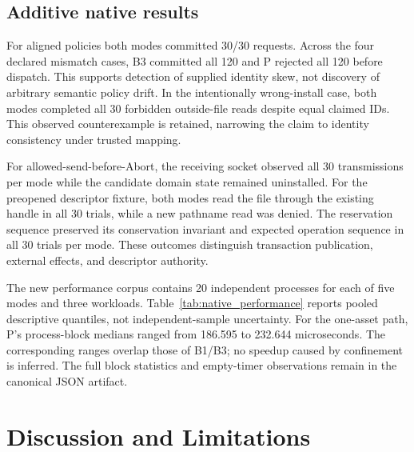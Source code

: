 \documentclass[electronics,article,submit,pdftex,moreauthors]{Definitions/mdpi}
\newcommand{\EvidenceDir}{../../../work_reports/pbea/204_Astra_review/revision/generated}
\begin{document}
\subsection{Additive native results}
\begin{table}[H]\caption{Additional B3/P observations from the separately frozen revision source.}\centering\end{table}
For aligned policies both modes committed 30/30 requests. Across the four declared mismatch cases, B3 committed all 120 and P rejected all 120 before dispatch. This supports detection of supplied identity skew, not discovery of arbitrary semantic policy drift. In the intentionally wrong-install case, both modes completed all 30 forbidden outside-file reads despite equal claimed IDs. This observed counterexample is retained, narrowing the claim to identity consistency under trusted mapping.

For allowed-send-before-Abort, the receiving socket observed all 30 transmissions per mode while the candidate domain state remained uninstalled. For the preopened descriptor fixture, both modes read the file through the existing handle in all 30 trials, while a new pathname read was denied. The reservation sequence preserved its conservation invariant and expected operation sequence in all 30 trials per mode. These outcomes distinguish transaction publication, external effects, and descriptor authority.

The new performance corpus contains 20 independent processes for each of five modes and three workloads. Table~\ref{tab:native_performance} reports pooled descriptive quantiles, not independent-sample uncertainty. For the one-asset path, P's process-block medians ranged from 186.595 to 232.644 microseconds. The corresponding ranges overlap those of B1/B3; no speedup caused by confinement is inferred. The full block statistics and empty-timer observations remain in the canonical JSON artifact.
\begin{table}[H]\caption{New native timing summaries in microseconds, generated from raw samples. Each row represents 20 independent process blocks and 10,000 measured sequential operations.}\label{tab:native_performance}\centering

\end{table}

\section{Discussion and Limitations}\label{sec:discussion}
\end{document}
